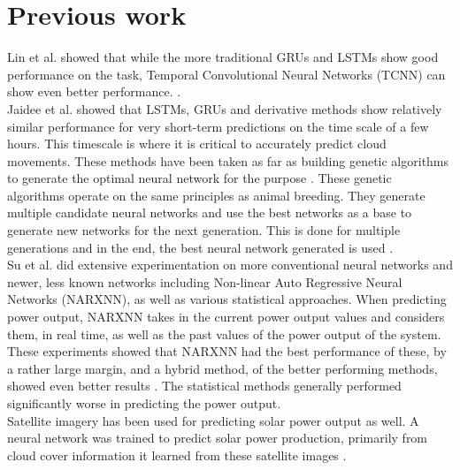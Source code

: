 \section{Previous work}
Lin et al. \cite{lin_temporal_2020} showed that while the more traditional GRUs and LSTMs show good performance on the task, Temporal Convolutional Neural Networks (TCNN) can show even better performance. \textit{} \cite{lin_temporal_2020}. \\
Jaidee et al. \cite{jaidee_very_2019} showed that LSTMs, GRUs and derivative methods show relatively similar performance for very short-term predictions on the time scale of a few hours. This timescale is where it is critical to accurately predict cloud movements. 
These methods have been taken as far as building genetic algorithms to generate the optimal neural network for the purpose \cite{jaidee_very_2019}. These genetic algorithms operate on the same principles as animal breeding. They generate multiple candidate neural networks and use the best networks as a base to generate new networks for the next generation. This is done for multiple generations and in the end, the best neural network generated is used \cite{jaidee_very_2019}.\\
Su et al. \cite{su_machine_2019} did extensive experimentation on more conventional neural networks and newer, less known networks including  Non-linear Auto Regressive Neural Networks (NARXNN), as well as various statistical approaches. When predicting power output, NARXNN takes in the current power output values and considers them, in real time, as well as the past values of the power output of the system. These experiments showed that NARXNN had the best performance of these, by a rather large margin, and a hybrid method, of the better performing methods, showed even better results \cite{anderson_using_2018}. The statistical methods generally performed significantly worse in predicting the power output. \\
Satellite imagery has been used for predicting solar power output as well. A neural network was trained to predict solar power production, primarily from cloud cover information it learned from these satellite images \cite{jang_solar_2016}.\\